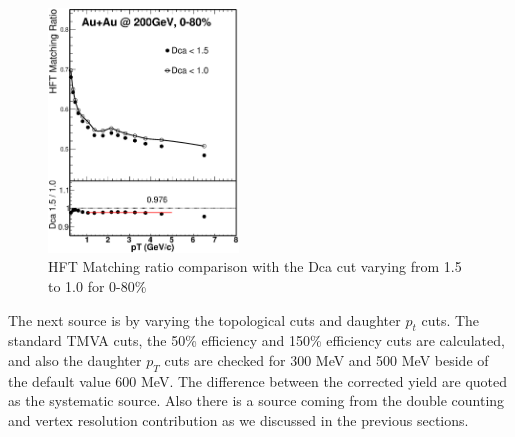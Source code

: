 \begin{figure}[htbp]
\centering
\includegraphics[keepaspectratio,width=0.45\textwidth]{figure/Run14_D0HFT/HFTMatching_Dca_Ratio_7.eps}
\caption{HFT Matching ratio comparison with the Dca cut varying from 1.5 to 1.0 for 0-80\% }
\label{fig:HFTMatching_Dca_Ratio_7}
\end{figure}


The next source is by varying the topological cuts and daughter $p_t$ cuts. The standard TMVA cuts, the 50\% efficiency and 150\% efficiency cuts are calculated, and also the daughter $p_T$ cuts are checked for 300 MeV and 500 MeV beside of the default value 600 MeV. The difference between the corrected yield are quoted as the systematic source. Also there is a source coming from the double counting and vertex resolution contribution as we discussed in the previous sections.

